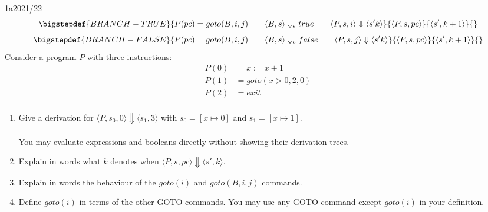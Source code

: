 \begin{exambox}{1a}{2021/22}
	\[\bigstepdef{BRANCH-TRUE}{P(pc) = goto(B, i, j) \qquad \langle B, s \rangle \Downarrow_e true \qquad \langle P, s, i \rangle \Downarrow \langle s' k \rangle}{\langle P, s, pc \rangle}{\langle s', k+1 \rangle}{}\]
	\[\bigstepdef{BRANCH-FALSE}{P(pc) = goto(B, i, j) \qquad \langle B, s \rangle \Downarrow_e false \qquad \langle P, s, j \rangle \Downarrow \langle s' k \rangle}{\langle P, s, pc \rangle}{\langle s', k+1 \rangle}{}\]
	Consider a program $P$ with three instructions:
	\[\begin{split}
		P(0) & = x:= x + 1 \\
		P(1) & = goto(x>0, 2, 0) \\
		P(2) & = exit \\
	\end{split}\]
	\begin{enumerate}[label=\roman*)]
		\item {Give a derivation for $\langle P, s_0, 0 \rangle \Downarrow \langle s_1, 3 \rangle$ with $s_0 = [x \mapsto 0]$ and $s_1 = [x \mapsto 1]$.
		\\
		\\ You may evaluate expressions and booleans directly without showing their derivation trees.}
		\item Explain in words what $k$ denotes when $\langle P, s, pc \rangle \Downarrow \langle s', k \rangle$.
		\item Explain in words the behaviour of the $goto(i)$ and $goto(B, i, j)$ commands. 
		\item Define $goto(i)$ in terms of the other GOTO commands. You may use any GOTO command except $goto(i)$ in your definition.
	\end{enumerate}
\end{exambox}
